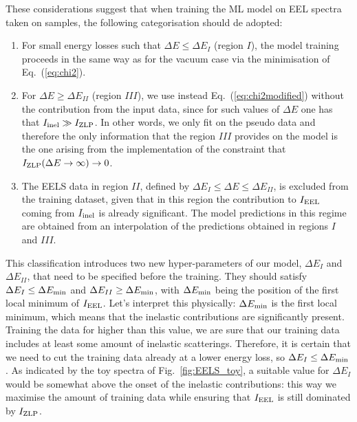 These considerations suggest that when training the ML model on EEL spectra taken on samples,
the following categorisation should de adopted:

\begin{enumerate}

\item For small energy losses such that $\Delta E \le \Delta E_I$ (region $I$),
  the model training  proceeds in the same way as for the vacuum case
  via the minimisation of Eq.~(\ref{eq:chi2}).

\item  
  For $\Delta E \ge \Delta E_{II}$ (region $III$), we use instead Eq.~(\ref{eq:chi2modified})
  without the contribution from the input data, since for such values
  of $\Delta E$ one has that $I_{\rm inel}\gg I_{\rm ZLP}$.
  In other words, we only fit on the pseudo data and therefore
  the only information that the region $III$ provides
  on the model is the one arising from the implementation
  of the constraint that $I_{\rm ZLP}(\Delta E\to \infty)\to 0$.

\item The EELS data in region $II$, defined by $\Delta E_I \le \Delta E \le \Delta E_{II}$,
  is excluded from the training dataset, given that in this region the contribution to $I_{\rm EEL}$
  coming from $I_{\rm inel}$ is already significant.
  The model predictions in this regime are obtained from an interpolation
  of the predictions obtained in regions $I$ and $III$.

\end{enumerate}

This classification introduces two new hyper-parameters of our model, $\Delta E_I$ and
$\Delta E_{II}$, that need to be specified before the training.
%
They should satisfy $\Delta E_I \le \Delta E_{\rm min}$ and $\Delta E_{II} \ge \Delta E_{\rm min}$,
with $\Delta E_{\rm min}$ being the position of the first local minimum of $I_{\rm EEL}$.
%
Let's interpret this physically: $\Delta E_{\rm min}$ is the first local minimum, which means that 
the inelastic contributions are significantly present.
%
Training the data for higher than this value, we are sure that our training data includes
at least some amount of inelastic scatterings.
%
Therefore, it is certain that we need to cut the training data already at a lower energy loss,
so $\Delta E_I \le \Delta E_{\rm min}$.
%
As indicated by the toy spectra of Fig.~\ref{fig:EELS_toy}, a suitable value for $\Delta E_{I}$
would be somewhat above the onset of the inelastic contributions: this way we maximise
the amount of training data while ensuring that $I_{\rm EEL}$ is still dominated
by $I_{\rm ZLP}$.\\

